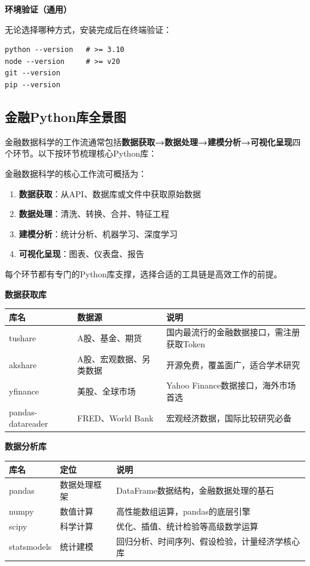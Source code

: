 \textbf{环境验证（通用）}

无论选择哪种方式，安装完成后在终端验证：

\begin{lstlisting}[style=shell]
python --version   # >= 3.10
node --version     # >= v20
git --version
pip --version
\end{lstlisting}

\subsection{金融Python库全景图}

金融数据科学的工作流通常包括\textbf{数据获取→数据处理→建模分析→可视化呈现}四个环节。以下按环节梳理核心Python库：

\begin{theorybox}[金融数据科学工作流与工具链]
金融数据科学的核心工作流可概括为：
\begin{enumerate}[leftmargin=2em]
  \item \textbf{数据获取}：从API、数据库或文件中获取原始数据
  \item \textbf{数据处理}：清洗、转换、合并、特征工程
  \item \textbf{建模分析}：统计分析、机器学习、深度学习
  \item \textbf{可视化呈现}：图表、仪表盘、报告
\end{enumerate}
每个环节都有专门的Python库支撑，选择合适的工具链是高效工作的前提。
\end{theorybox}

\textbf{数据获取库}

\begin{table}[H]
\centering
\small
\begin{tabular}{llp{6cm}}
\toprule
\textbf{库名} & \textbf{数据源} & \textbf{说明} \\
\midrule
tushare & A股、基金、期货 & 国内最流行的金融数据接口，需注册获取Token \\
akshare & A股、宏观数据、另类数据 & 开源免费，覆盖面广，适合学术研究 \\
yfinance & 美股、全球市场 & Yahoo Finance数据接口，海外市场首选 \\
pandas-datareader & FRED、World Bank & 宏观经济数据，国际比较研究必备 \\
\bottomrule
\end{tabular}
\end{table}

\textbf{数据分析库}

\begin{table}[H]
\centering
\small
\begin{tabular}{llp{6cm}}
\toprule
\textbf{库名} & \textbf{定位} & \textbf{说明} \\
\midrule
pandas & 数据处理框架 & DataFrame数据结构，金融数据处理的基石 \\
numpy & 数值计算 & 高性能数组运算，pandas的底层引擎 \\
scipy & 科学计算 & 优化、插值、统计检验等高级数学运算 \\
statsmodels & 统计建模 & 回归分析、时间序列、假设检验，计量经济学核心库 \\
\bottomrule
\end{tabular}
\end{table}

